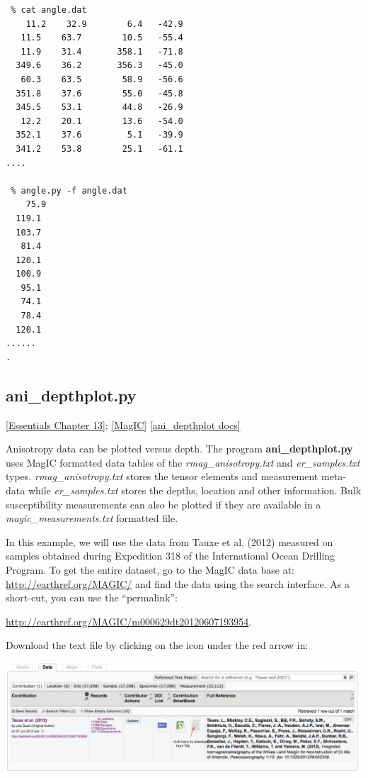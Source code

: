 \documentclass[11pt]{book}
\begin{document}
{{ \begin{verbatim}
 % cat angle.dat
    11.2    32.9 	    6.4   -42.9 
   11.5    63.7 	   10.5   -55.4 
   11.9    31.4 	  358.1   -71.8 
  349.6    36.2 	  356.3   -45.0 
   60.3    63.5 	   58.9   -56.6 
  351.8    37.6 	   55.0   -45.8 
  345.5    53.1 	   44.8   -26.9 
   12.2    20.1 	   13.6   -54.0 
  352.1    37.6 	    5.1   -39.9 
  341.2    53.8 	   25.1   -61.1 
....

 % angle.py -f angle.dat
    75.9 
  119.1 
  103.7 
   81.4 
  120.1 
  100.9 
   95.1 
   74.1 
   78.4 
  120.1 
......
.
\end{verbatim}

\subsection{ani\_depthplot.py} 
\href{http://magician.ucsd.edu/Essentials_2/WebBook2ch13.html#ch13}{[Essentials Chapter 13]}; 
\href{#MagIC}{[MagIC]}
\href{http://earthref.org/PmagPy/pmagpydocs/ani_depthplot-module.html}{[ani\_depthplot docs]}

Anisotropy data can be plotted versus depth.  The program {\bf ani\_depthplot.py} uses MagIC formatted data tables of the {\it rmag\_anisotropy.txt} and {\it er\_samples.txt} types.  {\it rmag\_anisotropy.txt} stores the tensor elements and measurement meta-data while {\it er\_samples.txt} stores the depths, location and other information.  Bulk susceptibility measurements can also be plotted if they are available in a {\it magic\_measurements.txt} formatted file.  

In this example, we will use the data from Tauxe et al. (2012) \nocite{tauxe12} measured on samples obtained during Expedition 318 of the International Ocean Drilling Program.  To get the entire dataset, go to the MagIC data base at:  \url{http://earthref.org/MAGIC/}   
and find the data using the search interface.   As a short-cut, you can use the ``permalink'': 

\url{http://earthref.org/MAGIC/m000629dt20120607193954}.   

Download the text file by clicking on the icon under the red arrow in:

  \includegraphics[width=15cm]{EPSfiles/tauxe12-magic.eps}

}}
\end{document}
